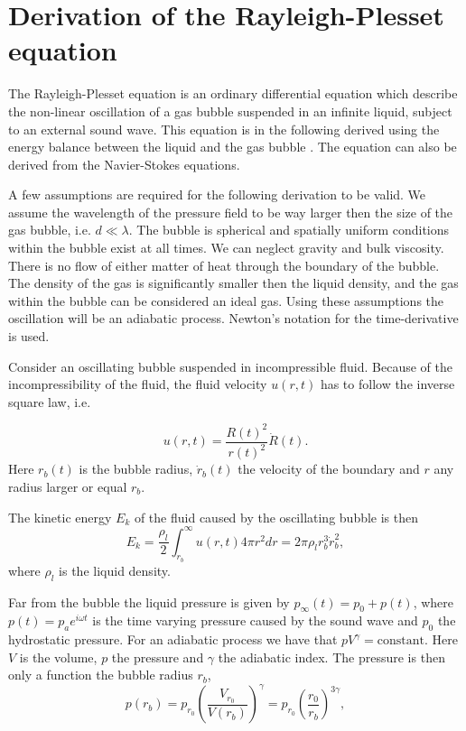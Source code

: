 
\section{Derivation of the Rayleigh-Plesset equation}
The Rayleigh-Plesset equation is an ordinary differential equation which describe the non-linear oscillation of a gas bubble suspended in an infinite liquid, subject to an external sound wave. This equation is in the following derived using the energy balance between the liquid and the gas bubble \cite{Moss2014}. The equation can also be derived from the Navier-Stokes equations\cite{leighton2007derivation}.

A few assumptions are required for the following derivation to be valid. We assume the wavelength of the pressure field to be way larger then the size of the gas bubble, i.e. $d \ll \lambda$. The bubble is spherical and spatially uniform conditions within the bubble exist at all times. We can neglect gravity and bulk viscosity. There is no flow of either matter of heat through the boundary of the bubble. The density of the gas is significantly smaller then the liquid density, and the gas within the bubble can be considered an ideal gas. Using these assumptions the oscillation will be an adiabatic process.  Newton's notation for the time-derivative is used.

Consider an oscillating bubble suspended in incompressible fluid. Because of the incompressibility of the fluid, the fluid velocity $u(r,t)$ has to follow the inverse square law, i.e. 

\begin{equation}
\label{eq:1}
u(r,t) = \frac{R(t)^2}{r(t)^2}\dot{R}(t).
\end{equation}
Here $r_b(t)$ is the bubble radius, $\dot{r}_b(t)$ the velocity of the boundary and $r$ any radius larger or equal $r_b$. 

The kinetic energy $E_k$ of the fluid caused by the oscillating bubble is then
\begin{equation}
\label{kinetic energy}
E_k = \frac{\rho_l}{2}\int_{r_b}^\infty u(r,t)4\pi r^2 dr = 2\pi\rho_l r_b^3 \dot{r}_b^2,
\end{equation}
where $\rho_l$ is the liquid density.

Far from the bubble the liquid pressure is given by $p_{\infty}(t) = p_0 + p(t)$, where $p(t) = p_a e^{i\omega t}$ is the time varying pressure caused by the sound wave and $p_0$ the hydrostatic pressure. For an adiabatic process we have that $pV^{\gamma}=\mathrm{constant}$. Here $V$ is the volume, $p$ the pressure and $\gamma$ the adiabatic index. The pressure is then only a function the bubble radius $r_b$,
\begin{equation}
p(r_b) = p_{r_0}\left(\frac{V_{r_0}}{V(r_b)}\right)^{\gamma} =  p_{r_0}\left(\frac{r_0}{r_b}\right)^{3\gamma},
\end{equation}

